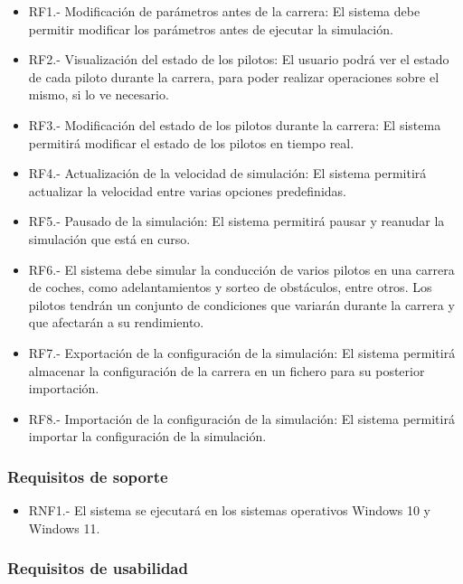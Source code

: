 \begin{itemize}
    \item RF1.- Modificación de parámetros antes de la carrera: El sistema debe permitir modificar los parámetros antes de ejecutar la simulación.
    \item RF2.- Visualización del estado de los pilotos: El usuario podrá ver el estado de cada piloto durante la carrera, para poder realizar operaciones sobre el mismo, si lo ve necesario.
    \item RF3.- Modificación del estado de los pilotos durante la carrera: El sistema permitirá modificar el estado de los pilotos en tiempo real.
    \item RF4.- Actualización de la velocidad de simulación: El sistema permitirá actualizar la velocidad entre varias opciones predefinidas.
    \item RF5.- Pausado de la simulación: El sistema permitirá pausar y reanudar la simulación que está en curso.
    \item RF6.- El sistema debe simular la conducción de varios pilotos en una carrera de coches, como adelantamientos y sorteo de obstáculos, entre otros. Los pilotos tendrán un conjunto de condiciones que variarán durante la carrera y que afectarán a su rendimiento.
    \item RF7.- Exportación de la configuración de la simulación: El sistema permitirá almacenar la configuración de la carrera en un fichero para su posterior importación.
    \item RF8.- Importación de la configuración de la simulación: El sistema permitirá importar la configuración de la simulación.
\end{itemize}


\subsubsection{Requisitos de soporte}

\begin{itemize}
    \item RNF1.- El sistema se ejecutará en los sistemas operativos Windows 10 y Windows 11.
\end{itemize}

\subsubsection{Requisitos de usabilidad}

